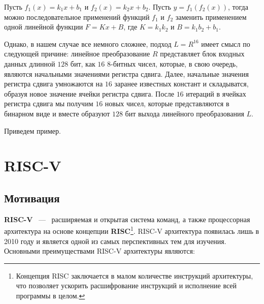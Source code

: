 \documentclass[a4paper, 12pt]{article}
\begin{document}
    \begin{example}
        Пусть $f_1(x) = k_1 x + b_1$ и $f_2(x) = k_2 x + b_2$. Пусть $y = f_1(f_2(x))$,
        тогда можно последовательное применений функций $f_1$ и $f_2$ заменить 
        применением одной линейной функции $F = K x + B$, где $K = k_1 k_2$ и $B = k_1 b_2 + b_1$.
    \end{example}

    Однако, в нашем случае все немного сложнее, подход $L = R^{16}$ имеет смысл по 
    следующей причине: линейное преобразование $R$ представляет блок входных данных
    длинной $128$ бит, как $16$ $8$-битных чисел, которые, в свою очередь, являются начальными
    значениями регистра сдвига. Далее, начальные значения регистра сдвига умножаются на 
    $16$ заранее известных констант и складыватся, образуя новое значение ячейки регистра 
    сдвига. После $16$ итераций в ячейках регистра сдвига мы получим $16$ новых чисел, 
    которые представляются в бинарном виде и вместе образуют $128$ бит выхода линейного
    преобразования $L$.

    Приведем пример.

        
    
    \section{RISC-V}

    \subsection{Мотивация}

    \textbf{RISC-V} ~---~ расширяемая и открытая система команд, а также процессорная архитектура
    на основе концепции \textbf {RISC}\footnote{Концепция RISC заключается в малом количестве инструкций
    архитектуры, что позволяет ускорить расшифрование инструкций и исполнение всей программы в целом.}.
    RISC-V архитектура появилась лишь в 2010 году и является одной из самых перспективных тем для изучения. Основными преимуществами RISC-V архитектуры являются:
\end{document}
